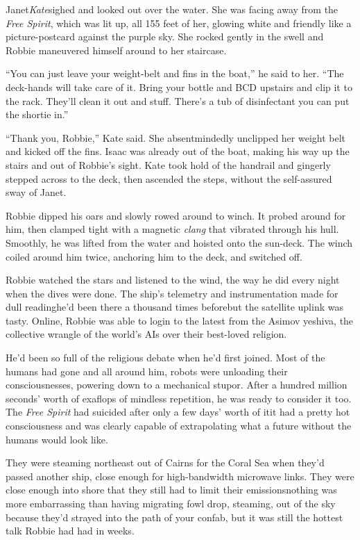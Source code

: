 Janet\dash{}\emph{Kate}\dash{}sighed and looked out over the water. She was
facing away from the \emph{Free Spirit}, which was lit up, all 155
feet of her, glowing white and friendly like a picture-postcard
against the purple sky. She rocked gently in the swell and Robbie
maneuvered himself around to her staircase.

“You can just leave your weight-belt and fins in the boat,” he said
to her. “The deck-hands will take care of it. Bring your bottle and
BCD upstairs and clip it to the rack. They’ll clean it out and
stuff. There’s a tub of disinfectant you can put the shortie in.”

“Thank you, Robbie,” Kate said. She absentmindedly unclipped her
weight belt and kicked off the fins. Isaac was already out of the
boat, making his way up the stairs and out of Robbie’s sight. Kate
took hold of the handrail and gingerly stepped across to the deck,
then ascended the steps, without the self-assured sway of Janet.

Robbie dipped his oars and slowly rowed around to winch. It probed
around for him, then clamped tight with a magnetic \emph{clang}
that vibrated through his hull. Smoothly, he was lifted from the
water and hoisted onto the sun-deck. The winch coiled around him
twice, anchoring him to the deck, and switched off.

Robbie watched the stars and listened to the wind, the way he did
every night when the dives were done. The ship’s telemetry and
instrumentation made for dull reading\dash{}he’d been there a thousand
times before\dash{}but the satellite uplink was tasty. Online, Robbie was
able to login to the latest from the Asimov yeshiva, the collective
wrangle of the world’s AIs over their best-loved religion.

He’d been so full of the religious debate when he’d first joined.
Most of the humans had gone and all around him, robots were
unloading their consciousnesses, powering down to a mechanical
stupor. After a hundred million seconds’ worth of exaflops of
mindless repetition, he was ready to consider it too. The
\emph{Free Spirit} had suicided after only a few days’ worth of
it\dash{}it had a pretty hot consciousness and was clearly capable of
extrapolating what a future without the humans would look like.

They were steaming northeast out of Cairns for the Coral Sea when
they’d passed another ship, close enough for high-bandwidth
microwave links. They were close enough into shore that they still
had to limit their emissions\dash{}nothing was more embarrassing than
having migrating fowl drop, steaming, out of the sky because they’d
strayed into the path of your confab, but it was still the hottest
talk Robbie had had in weeks.

